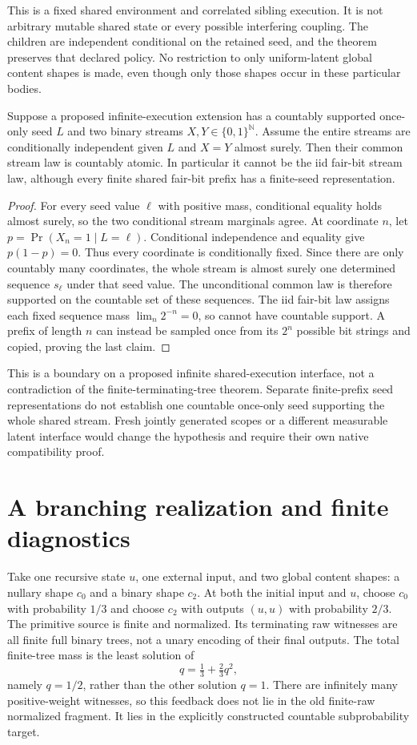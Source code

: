 \documentclass[11pt]{article}
\begin{document}
This is a fixed shared environment and correlated sibling execution. It is not arbitrary mutable shared state or every possible interfering coupling. The children are independent conditional on the retained seed, and the theorem preserves that declared policy. No restriction to only uniform-latent global content shapes is made, even though only those shapes occur in these particular bodies.

\begin{proposition}
Suppose a proposed infinite-execution extension has a countably supported once-only seed $L$ and two binary streams $X,Y\in\{0,1\}^{\mathbb N}$. Assume the entire streams are conditionally independent given $L$ and $X=Y$ almost surely. Then their common stream law is countably atomic. In particular it cannot be the iid fair-bit stream law, although every finite shared fair-bit prefix has a finite-seed representation.
\end{proposition}
\begin{proof}
For every seed value $\ell$ with positive mass, conditional equality holds almost surely, so the two conditional stream marginals agree. At coordinate $n$, let $p=\Pr(X_n=1\mid L=\ell)$. Conditional independence and equality give $p(1-p)=0$. Thus every coordinate is conditionally fixed. Since there are only countably many coordinates, the whole stream is almost surely one determined sequence $s_\ell$ under that seed value. The unconditional common law is therefore supported on the countable set of these sequences. The iid fair-bit law assigns each fixed sequence mass $\lim_n2^{-n}=0$, so cannot have countable support. A prefix of length $n$ can instead be sampled once from its $2^n$ possible bit strings and copied, proving the last claim.
\end{proof}
This is a boundary on a proposed infinite shared-execution interface, not a contradiction of the finite-terminating-tree theorem. Separate finite-prefix seed representations do not establish one countable once-only seed supporting the whole shared stream. Fresh jointly generated scopes or a different measurable latent interface would change the hypothesis and require their own native compatibility proof.

\section{A branching realization and finite diagnostics}
Take one recursive state $u$, one external input, and two global content shapes: a nullary shape $c_0$ and a binary shape $c_2$. At both the initial input and $u$, choose $c_0$ with probability $1/3$ and choose $c_2$ with outputs $(u,u)$ with probability $2/3$. The primitive source is finite and normalized. Its terminating raw witnesses are all finite full binary trees, not a unary encoding of their final outputs. The total finite-tree mass is the least solution of
\[
 q=\tfrac13+\tfrac23q^2,
\]
namely $q=1/2$, rather than the other solution $q=1$. There are infinitely many positive-weight witnesses, so this feedback does not lie in the old finite-raw normalized fragment. It lies in the explicitly constructed countable subprobability target.
\end{document}
